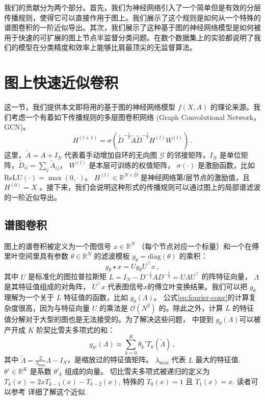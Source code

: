 \documentclass{article} %
\begin{document}
我们的贡献分为两个部分。首先，我们为神经网络引入了一个简单但是有效的分层传播规则，使得它可以直接作用于图上。我们展示了这个规则是如何从一个特殊的谱图卷积\citep{hammond2011wavelets}的一阶近似导出。其次，我们展示了这种基于图的神经网络模型是如何被用于快速的可扩展的图上节点半监督分类问题。在数个数据集上的实验都说明了我们的模型在分类精度和效率上能够比肩最顶尖的无监督算法。

\section{图上快速近似卷积}
\label{sec:fast-convs}

这一节，我们提供本文即将用的基于图的神经网络模型 $f(X, A)$ 的理论来源。我们考虑一个有着如下传播规则的多层图卷积网络 (Graph Convolutional Network，GCN)。
\begin{equation}
  \textstyle
  H^{(l+1)}= \sigma\!\left(\tilde{D}^{-\frac{1}{2}} \tilde{A}\tilde{D}^{-\frac{1}{2}}H^{(l)} W^{(l)} \right) \, .
\label{eq:gcn-layer}
\end{equation}
这里，$\tilde{A} = A + I_N$ 代表着手动增加自环的无向图 $\mathcal{G}$ 的邻接矩阵，$I_N$ 是单位矩阵，$\tilde{D}_{ii} = \sum_j \tilde{A}_{ij}$， $W^{(l)}$ 是本层可训练的权值矩阵， $\sigma(\cdot)$ 是激励函数，比如$\mathrm{ReLU}(\cdot) = \max(0,\cdot)$。 $H^{(l)}\in \mathbb{R}^{N\times D}$ 是神经网络第$l$层节点的激励值，且 $H^{(0)}=X$ 。接下来，我们会说明这种形式的传播规则可以通过图上的局部谱滤波\citep{hammond2011wavelets, defferrard2016convolutional}的一阶近似导出。

\subsection{谱图卷积}
图上的谱卷积被定义为一个图信号 $x\in \mathbb{R}^N$ （每个节点对应一个标量）和一个在傅里叶空间里具有参数 $\theta\in \mathbb{R}^N$ 的滤波模板 $g_{\theta}=\text{diag}(\theta)$ 的乘积：
\begin{equation}
  g_{\theta} \star x =  Ug_{\theta}U^\top x \, ,
\label{eq:fourier-conv}
\end{equation}
其中 $U$ 是标准化的图拉普拉斯矩 $L = I_N - D^{-\frac{1}{2}}AD^{-\frac{1}{2}} = U\Lambda U^\top$ 的阵特征向量， $\Lambda$ 是其特征值组成的对角阵， $U^\top x$ 代表图信号$x$的傅立叶变换结果。我们可以把 $g_{\theta}$ 理解为一个关于 $L$ 特征值的函数，比如 $g_{\theta}(\Lambda)$。 公式\ref{eq:fourier-conv}的计算复杂度很高，因为与特征向量 $U$ 的乘法是 $\mathcal{O}(N^2)$ 的。除此之外，计算 $L$ 的特征值分解对于大型的图也是无法接受的。为了解决这些问题， \cite{hammond2011wavelets}中提到 $g_{\theta}(\Lambda)$可以被产开成 $K$ 阶契比雪夫多项式的和：
\begin{equation}
  g_{\theta'}(\Lambda) \approx \sum_{k=0}^{K} \theta_k ' T_k(\tilde{\Lambda}) \, ,
\label{eq:tchebyshew}
\end{equation}
其中 $\tilde{\Lambda}=\frac{2}{\lambda_{\text{max}}}\Lambda-I_N$，是缩放过的特征值矩阵。 $\lambda_{\text{max}}$ 代表 $L$ 最大的特征值. $\theta'\in \mathbb{R}^K$ 是系数 $\theta'_k$ 组成的向量。 切比雪夫多项式被递归的定义为 $T_k(x) = 2xT_{k-1}(x) - T_{k-2}(x)$, 特殊的 $T_0(x)=1$ 且 $T_1(x)=x$. 读者可以参考 \cite{hammond2011wavelets} 详细了解这个近似.
\end{document}
